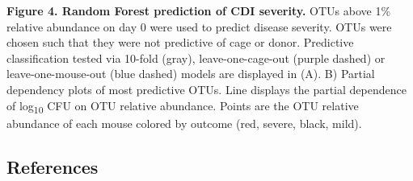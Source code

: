 \documentclass[11pt,]{article}
\begin{document}
\textbf{Figure 4. Random Forest prediction of CDI severity.} OTUs above
1\% relative abundance on day 0 were used to predict disease severity.
OTUs were chosen such that they were not predictive of cage or donor.
Predictive classification tested via 10-fold (gray), leave-one-cage-out
(purple dashed) or leave-one-mouse-out (blue dashed) models are
displayed in (A). B) Partial dependency plots of most predictive OTUs.
Line displays the partial dependence of log\textsubscript{10} CFU on OTU
relative abundance. Points are the OTU relative abundance of each mouse
colored by outcome (red, severe, black, mild).

\newpage

\subsection*{References}\label{references}
\end{document}
